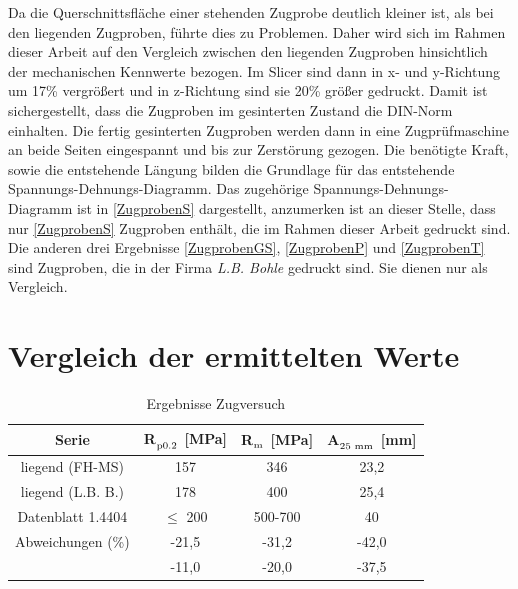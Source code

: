 Da die Querschnittsfläche einer stehenden Zugprobe deutlich kleiner ist, als bei den liegenden Zugproben, führte dies zu Problemen. Daher wird sich im Rahmen dieser Arbeit auf den Vergleich zwischen den liegenden Zugproben hinsichtlich der mechanischen Kennwerte bezogen.
Im Slicer sind dann in x- und y-Richtung um 17\% vergrößert und in z-Richtung sind sie 20\% größer gedruckt. Damit ist sichergestellt, dass die Zugproben im gesinterten Zustand die DIN-Norm einhalten. Die fertig gesinterten Zugproben werden dann in eine Zugprüfmaschine an beide Seiten eingespannt und bis zur Zerstörung gezogen. Die benötigte Kraft, sowie die entstehende Längung bilden die Grundlage für das entstehende Spannungs-Dehnungs-Diagramm.
Das zugehörige Spannungs-Dehnungs-Diagramm ist in \autoref{ZugprobenS} dargestellt, anzumerken ist an dieser Stelle, dass nur \autoref{ZugprobenS} Zugproben enthält, die im Rahmen dieser Arbeit gedruckt sind. Die anderen drei Ergebnisse \autoref{ZugprobenGS}, \autoref{ZugprobenP} und \autoref{ZugprobenT} sind Zugproben, die in der Firma \textit{L.B. Bohle} gedruckt sind. Sie dienen nur als Vergleich.
 
\section{Vergleich der ermittelten Werte}




\begin{table}[h]
  \centering
  \caption{Ergebnisse Zugversuch}
  \begin{tabular}{cccc}
  \toprule
  \textbf{Serie} & \textbf{R$_{\textsubscript{p0.2}}$ [MPa]} & \textbf{R$_{\textsubscript{m}}$ [MPa]} & \textbf{A$_{\textsubscript{25 mm}}$ [mm]} \\
  \midrule
  liegend (FH-MS) & 157 & 346 & 23,2 \\
  liegend (L.B. B.) & 178 & 400 & 25,4 \\
  Datenblatt 1.4404 \autocite{AGSTSteel:1.4404} & $\leq$ 200 & 500-700 & 40 \\
  \midrule
  Abweichungen (\%) 
    & -21,5 & -31,2 & -42,0 \\
    & -11,0 & -20,0 & -37,5 \\
  \bottomrule
  \end{tabular}
  \label{BeispielTabelle}
\end{table}
